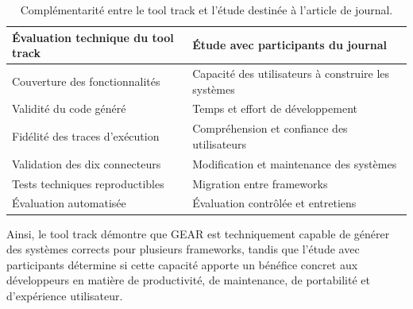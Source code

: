 \begin{table}[t]
    \centering
    \caption{Complémentarité entre le tool track et l'étude destinée à
    l'article de journal.}
    \label{tab:complementarite-publications}
    \begin{tabularx}{\textwidth}{@{}>{\raggedright\arraybackslash}X>{\raggedright\arraybackslash}X@{}}
        \toprule
        \textbf{Évaluation technique du tool track}
        & \textbf{Étude avec participants du journal} \\
        \midrule
        Couverture des fonctionnalités
            & Capacité des utilisateurs à construire les systèmes \\
        Validité du code généré
            & Temps et effort de développement \\
        Fidélité des traces d'exécution
            & Compréhension et confiance des utilisateurs \\
        Validation des dix connecteurs
            & Modification et maintenance des systèmes \\
        Tests techniques reproductibles
            & Migration entre frameworks \\
        Évaluation automatisée
            & Évaluation contrôlée et entretiens \\
        \bottomrule
    \end{tabularx}
\end{table}

Ainsi, le tool track démontre que GEAR est techniquement capable de
générer des systèmes corrects pour plusieurs frameworks, tandis que
l'étude avec participants détermine si cette capacité apporte un
bénéfice concret aux développeurs en matière de productivité, de
maintenance, de portabilité et d'expérience utilisateur.